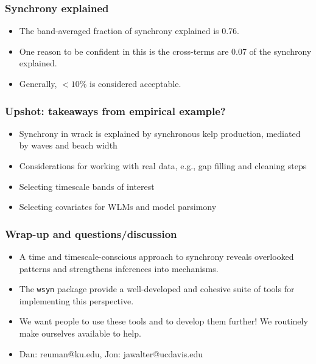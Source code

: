 \documentclass{beamer}
\begin{document}
\begin{frame}
\frametitle{Synchrony explained}
\begin{itemize}
\item The band-averaged fraction of synchrony explained is 0.76.
\item One reason to be confident in this is the cross-terms are 0.07 of the synchrony explained.
\item Generally, $<10\%$ is considered acceptable.
\end{itemize}
\end{frame}

{
\begin{frame}
\frametitle{Upshot: takeaways from empirical example?}
\begin{itemize}
\item Synchrony in wrack is explained by synchronous kelp production, mediated by waves and beach width
\item Considerations for working with real data, e.g., gap filling and cleaning steps
\item Selecting timescale bands of interest
\item Selecting covariates for WLMs and model parsimony
\end{itemize}
\end{frame}}

\begin{frame}
\frametitle{Wrap-up and questions/discussion}
\begin{itemize}
\item A time and timescale-conscious approach to synchrony reveals overlooked patterns and strengthens inferences into mechanisms.
\item The \texttt{wsyn} package provide a well-developed and cohesive suite of tools for implementing this perspective.
\item We want people to use these tools and to develop them further! We routinely make ourselves available to help.
\item Dan: reuman@ku.edu, Jon: jawalter@ucdavis.edu
\end{itemize}


\end{frame}
\end{document}
